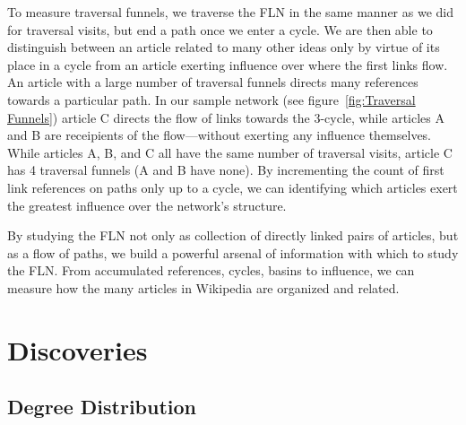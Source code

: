 \documentclass[pre,twocolumn,twoside,superscriptaddress,floatfix, aps, 10pt]{revtex4-1}
\newcommand{\green}[1]{{\leavevmode\color{javagreen}{#1}}} %
\begin{document}
To measure traversal funnels, we traverse the FLN in the same manner as we 
did for traversal visits, but end a path once we enter a cycle.
We are then able to distinguish between an article related to many other ideas
only by virtue of its place in a cycle from an article exerting influence over where the first links flow. 
An article with a large number of traversal funnels directs many references
towards a particular path. In our sample network 
(see figure~\ref{fig:Traversal Funnels}) article C 
directs the flow of links towards the 3-cycle, while articles A and B are 
receipients of the flow---without exerting any influence themselves. 
While articles A, B, and C all have the same number of traversal visits, 
article C has 4 traversal funnels (A and B have none). By incrementing the count of 
first link references on paths only up to a cycle, we can identifying which articles
exert the greatest influence over the network's structure.

By studying the FLN not only as collection of directly linked pairs of articles, but
as a flow of paths, 
we build a powerful arsenal of information with which to study the FLN. 
From accumulated references, cycles, basins to influence, we can measure how the many articles in Wikipedia are organized and related.





\section{Discoveries}

\green{TODO:
rewrite \\
introduce metric\\
find two or three salient points to discuss in each section \\
tie into bigger picture
\begin{itemize}
    \item reorder so paths and flow are described first then funnels and visits
    \item Basins expand explanation and break up into 2 paragraphs
    \item add more captions to figures
\end{itemize}
}

\subsection{Degree Distribution}
\end{document}
